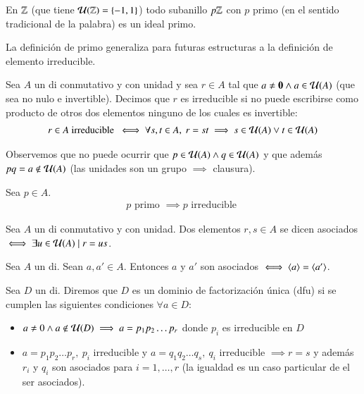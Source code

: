\begin{ej}
	En $\mathbb{Z}$ (que tiene $\mathcal{U}(\mathbb{Z}) = \{-1, 1\}$) todo subanillo $p\mathbb{Z}$ con $p$ primo (en el sentido tradicional de la palabra) es un ideal primo.
\end{ej}

La definición de primo generaliza para futuras estructuras a la definición de elemento irreducible.

\begin{dfn}
	Sea $A$ un \gls{di} conmutativo y con unidad y sea $r \in A$ tal que $a \neq \mathbf{0} \land a \in \mathcal{U}(A)$ (que sea no nulo e invertible). Decimos que $r$ es irreducible si no puede escribirse como producto de otros dos elementos ninguno de los cuales es invertible:
	\begin{align}
		r \in A \text{ irreducible } \iff \forall s,t \in A,\ r = st \implies s \in \mathcal{U}(A) \lor t \in \mathcal{U}(A)
	\end{align}
\end{dfn}

Observemos que no puede ocurrir que $p \in \mathcal{U}(A) \land q \in \mathcal{U}(A)$ y que además $pq = a \notin \mathcal{U}(A)$ (las unidades son un grupo $\implies$ clausura).


\begin{pro}
	Sea $p \in A$.
	\begin{align*}
		p \text{ primo } \implies p \text{ irreducible }
	\end{align*}
\end{pro}

\begin{dfn}
	Sea $A$ un \gls{di} conmutativo y con unidad. Dos elementos $r,s \in A$ se dicen asociados $\iff \exists u \in \mathcal{U}(A) \mid r = us$.
\end{dfn}

\begin{pro}
	Sea $A$ un \gls{di}. Sean $a,a' \in A$. Entonces $a$ y $a'$ son asociados $\iff \langle a\rangle = \langle a'\rangle$.
\end{pro}

\begin{dfn}
	\label{dfn:dfu}
	Sea $D$ un \gls{di}. Diremos que $D$ es un dominio de factorización única (\gls{dfu}) si se cumplen las siguientes condiciones $\forall a \in D$:
	\begin{itemize}
		\item $a \neq 0 \land a \not\in\mathcal{U}(D) \implies a = p_1p_2\dots p_r$ donde $p_i$ es irreducible en $D$
		\item $a = p_1p_2\dots p_r,\ p_i$ irreducible y $a = q_1q_2 \dots q_s,\ q_i$ irreducible $\implies r = s$ y además $r_i$ y $q_i$ son asociados para $i = 1, \dots, r$ (la igualdad es un caso particular de el ser asociados).
	\end{itemize}
\end{dfn}

